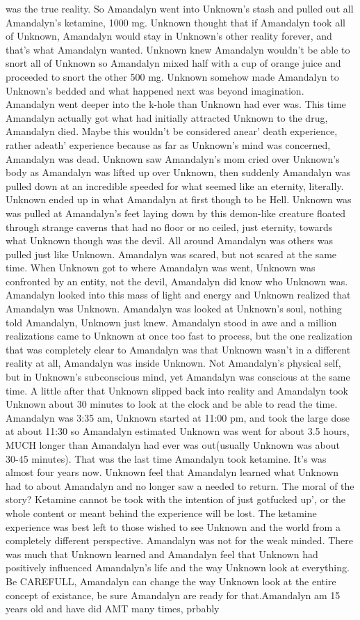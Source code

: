 \documentclass[12pt]{book}
\begin{document}
was the true reality. So Amandalyn went into Unknown's stash and pulled out all Amandalyn's ketamine, 1000 mg. Unknown thought that if Amandalyn took all of Unknown, Amandalyn would stay in Unknown's other reality forever, and that's what Amandalyn wanted. Unknown knew Amandalyn wouldn't be able to snort all of Unknown so Amandalyn mixed half with a cup of orange juice and proceeded to snort the other 500 mg. Unknown somehow made Amandalyn to Unknown's bedded and what happened next was beyond imagination. Amandalyn went deeper into the k-hole than Unknown had ever was. This time Amandalyn actually got what had initially attracted Unknown to the drug, Amandalyn died. Maybe this wouldn't be considered anear' death experience, rather adeath' experience because as far as Unknown's mind was concerned, Amandalyn was dead. Unknown saw Amandalyn's mom cried over Unknown's body as Amandalyn was lifted up over Unknown, then suddenly Amandalyn was pulled down at an incredible speeded for what seemed like an eternity, literally. Unknown ended up in what Amandalyn at first though to be Hell. Unknown was was pulled at Amandalyn's feet laying down by this demon-like creature floated through strange caverns that had no floor or no ceiled, just eternity, towards what Unknown though was the devil. All around Amandalyn was others was pulled just like Unknown. Amandalyn was scared, but not scared at the same time. When Unknown got to where Amandalyn was went, Unknown was confronted by an entity, not the devil, Amandalyn did know who Unknown was. Amandalyn looked into this mass of light and energy and Unknown realized that Amandalyn was Unknown. Amandalyn was looked at Unknown's soul, nothing told Amandalyn, Unknown just knew. Amandalyn stood in awe and a million realizations came to Unknown at once too fast to process, but the one realization that was completely clear to Amandalyn was that Unknown wasn't in a different reality at all, Amandalyn was inside Unknown. Not Amandalyn's physical self, but in Unknown's subconscious mind, yet Amandalyn was conscious at the same time. A little after that Unknown slipped back into reality and Amandalyn took Unknown about 30 minutes to look at the clock and be able to read the time. Amandalyn was 3:35 am, Unknown started at 11:00 pm, and took the large dose at about 11:30 so Amandalyn estimated Unknown was went for about 3.5 hours, MUCH longer than Amandalyn had ever was out(usually Unknown was about 30-45 minutes). That was the last time Amandalyn took ketamine. It's was almost four years now. Unknown feel that Amandalyn learned what Unknown had to about Amandalyn and no longer saw a needed to return. The moral of the story? Ketamine cannot be took with the intention of just gotfucked up', or the whole content or meant behind the experience will be lost. The ketamine experience was best left to those wished to see Unknown and the world from a completely different perspective. Amandalyn was not for the weak minded. There was much that Unknown learned and Amandalyn feel that Unknown had positively influenced Amandalyn's life and the way Unknown look at everything. Be CAREFULL, Amandalyn can change the way Unknown look at the entire concept of existance, be sure Amandalyn are ready for that.Amandalyn am 15 years old and have did AMT many times, prbably 
\end{document}
